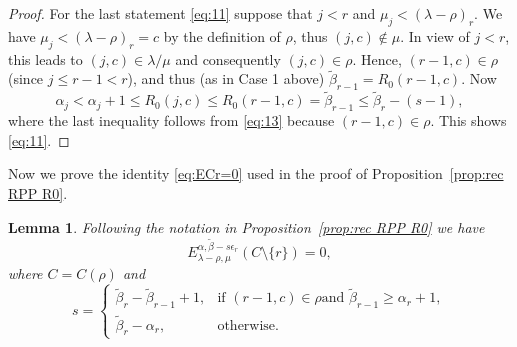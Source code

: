 \documentclass[12pt]{amsart}
\numberwithin{equation}{section}
\newtheorem{lem}[thm]{Lemma}
\theoremstyle{definition}
\newcommand\wb{\widetilde{\beta}}
\newcommand\lm{{\lambda/\mu}}
\begin{document}
\begin{proof}
  For the last statement \eqref{eq:11} suppose that $j<r$ and
  $\mu_j<(\lambda-\rho)_r$. We have $\mu_j<(\lambda-\rho)_r=c$ by
  the definition of $\rho$, thus $(j,c)\notin\mu$. In view of
  $j<r$, this leads to $(j,c) \in \lm$ and consequently
  $(j,c)\in \rho$. Hence, $(r-1,c)\in \rho$ (since $j \le r-1 < r$),
  and thus (as in Case 1 above) $\wb_{r-1}=R_0(r-1,c)$.
  Now
\[
\alpha_j < \alpha_j+1 \le R_0(j,c) \le R_0(r-1,c) = \wb_{r-1}\le \wb_r-(s-1),
\]
where the last inequality follows from \eqref{eq:13} because $(r-1,c)\in\rho$.
This shows \eqref{eq:11}.
\end{proof}

Now we prove the identity \eqref{eq:ECr=0} used in the proof of
Proposition~\ref{prop:rec RPP R0}.

\begin{lem}\label{lem:s}
  Following the notation in Proposition~\ref{prop:rec RPP R0} we have
  \begin{equation}\label{eq:e0}
E_{\lambda-\rho,\mu}^{\alpha,\wb-s\epsilon_r}(C\setminus\{r\}) = 0,
  \end{equation}
  where $C=C(\rho)$ and
      \[
s = \begin{cases}
  \wb_r-\wb_{r-1}+1, & \mbox{if $(r-1,c)\in\rho$
  and $\wb_{r-1}\ge\alpha_r+1$} ,\\
\wb_r-\alpha_r, &\mbox{otherwise} .
\end{cases}
  \]
\end{lem}
\end{document}

